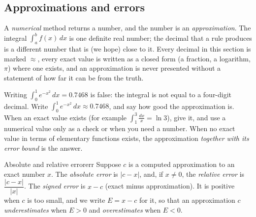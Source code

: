 \documentclass[11pt]{article}
\begin{document}
\subsection*{Approximations and errors}

A \emph{numerical} method returns a number, and the number is an \emph{approximation}. The integral $\int_a^bf(x)\,dx$ is one definite real number; the decimal that a rule produces is a different number that is (we hope) close to it. Every decimal in this section is marked $\approx$, every exact value is written as a closed form (a fraction, a logarithm, $\pi$) where one exists, and an approximation is never presented without a statement of how far it can be from the truth.

\begin{warn}
Writing $\int_0^1e^{-x^2}\,dx=0.7468$ is false: the integral is not equal to a four-digit decimal. Write $\int_0^1e^{-x^2}\,dx\approx0.7468$, and say how good the approximation is. When an exact value exists (for example $\int_1^3\frac{dx}x=\ln3$), give it, and use a numerical value only as a check or when you need a number. When no exact value in terms of elementary functions exists, the approximation \emph{together with its error bound} is the answer.
\end{warn}

\begin{defn}{Absolute and relative error}{err}
Suppose $c$ is a computed approximation to an exact number $x$. The \emph{absolute error} is $\lvert c-x\rvert$, and, if $x\ne0$, the \emph{relative error} is $\dfrac{\lvert c-x\rvert}{\lvert x\rvert}$. The \emph{signed error} is $x-c$ (exact minus approximation). It is positive when $c$ is too small, and we write $E=x-c$ for it, so that an approximation $c$ \emph{underestimates} when $E>0$ and \emph{overestimates} when $E<0$.
\end{defn}
\end{document}
